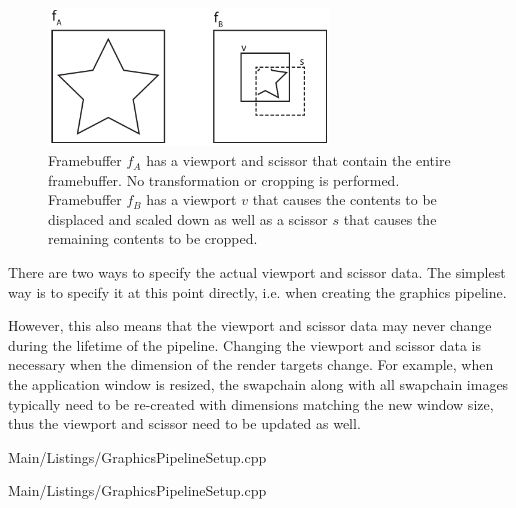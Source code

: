         \begin{figure}
          \includegraphics[width=0.666\textwidth]{Main/Images/ViewportScissorSample}
          \centering
          \caption{Framebuffer {\large$f_A$} has a viewport and scissor that contain the entire framebuffer. No transformation or cropping is performed. Framebuffer {\large$f_B$} has a viewport {\large$v$} that causes the contents to be displaced and scaled down as well as a scissor {\large$s$} that causes the remaining contents to be cropped.}
          \label{fig:ViewportScissorSample}
        \end{figure}

        There are two ways to specify the actual viewport and scissor data.
        The simplest way is to specify it at this point directly, i.e. when creating the graphics pipeline.

        However, this also means that the viewport and scissor data may never change during the lifetime of the pipeline.
        Changing the viewport and scissor data is necessary when the dimension of the render targets change.
        For example, when the application window is resized, the swapchain along with all swapchain images typically need to be re-created with dimensions matching the new window size, thus the viewport and scissor need to be updated as well.

        
        {Main/Listings/GraphicsPipelineSetup.cpp}

        
        {Main/Listings/GraphicsPipelineSetup.cpp}

